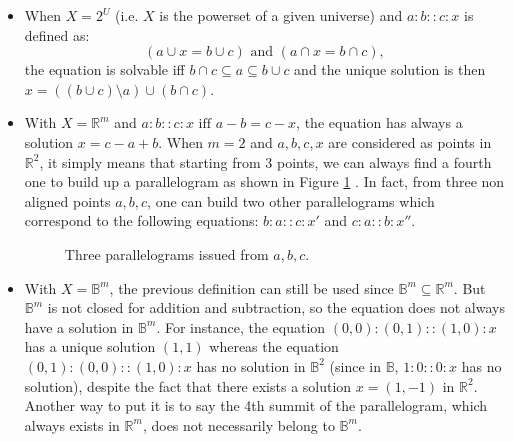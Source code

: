 \documentclass{ecai}
\begin{document}
\begin{itemize}
  \item When $X = 2^U$ (i.e. $X$ is the powerset of a given universe) and
    $a:b::c:x$ is defined as: $$(a \cup x= b \cup c) \mbox{ and }(a \cap x= b
    \cap c),$$ the equation is solvable iff $b \cap c \subseteq a \subseteq b
    \cup c$ and the unique solution is then $x= ((b \cup c) \setminus a)\cup (b
    \cap c)$.
\item With $X = \mathbb{R}^m$ and $a:b::c:x \mbox{ iff } a-b=c-x$, the equation
  has always a solution $x=c-a+b$. When $m=2$ and $a,b,c,x$ are considered as
  points in $\mathbb{R}^2$, it simply means that starting from 3 points, we can
  always find a fourth one to build up a parallelogram as shown in
  Figure \ref{para} \cite{PraRicLU2013}. In fact, from three non aligned points $a, b, c$, one can
  build two other parallelograms which correspond to the following equations:
  $b : a :: c : x'$ and $c : a :: b : x''$.
\begin{figure}
\begin{center}
\vspace{0.2cm}\caption{Three parallelograms issued from $a, b, c$.}\label{para}
\end{center}
\end{figure}
\item With $X = \mathbb{B}^m$, the previous definition can still be used since
  $\mathbb{B}^m \subseteq \mathbb{R}^m$. But $\mathbb{B}^m$ is not closed for
  addition and subtraction, so the equation does not always have  a solution in
  $\mathbb{B}^m$. For instance, the equation $(0, 0) : (0, 1) :: (1, 0) : x$ has
  a unique solution $(1, 1)$ whereas the equation $(0, 1) : (0, 0) :: (1, 0) :
  x$ has no solution in $\mathbb{B}^2$ (since in $\mathbb{B}$, $1:0::0:x$ has
  no solution), despite the fact that there exists a
  solution $x=(1,-1)$ in $\mathbb{R}^2$.  Another way to put it is to say the
  4th summit of the parallelogram, which always exists in $\mathbb{R}^m$, does
  not necessarily belong to $\mathbb{B}^m$.
\end{itemize}
\end{document}
